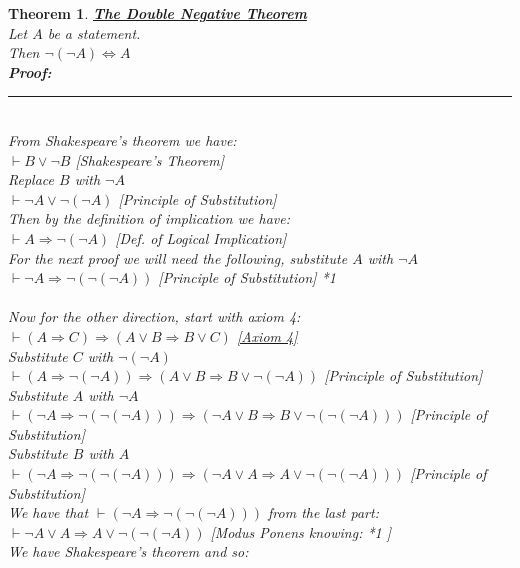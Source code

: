 \documentclass[12pt]{extarticle}
\theoremstyle{plain}
\newtheorem{thm}{Theorem}[section]
\theoremstyle{plain}
\theoremstyle{plain}
\theoremstyle{Definition}
\theoremstyle{Definition}
\theoremstyle{plain}
\theoremstyle{plain}
\newcommand{\prof}[0]{	\noindent \textbf{Proof:} \rule{500pt}{2pt} \\ }
\begin{document}
\begin{thm} \underline{\textbf{The Double Negative Theorem}} \\
	Let $A$ be a statement. \\ 
	Then $\lnot(\lnot A) \Leftrightarrow A$ \\
	\prof 
	From Shakespeare's theorem we have: \\ 
	$\vdash B \lor \lnot B$ \hfill [Shakespeare's Theorem] \\ 
	Replace $B$ with $\lnot A$ \\ 
	$\vdash \lnot A \lor \lnot (\lnot A)$ \hfill [Principle of Substitution]\\ 
	Then by the definition of implication we have: \\ 
	$\vdash A \Rightarrow \lnot (\lnot A)$ \hfill [Def. of Logical Implication] \\
	For the next proof we will need the following, substitute $A$ with $\lnot A$ \\ 
	$\vdash \lnot A \Rightarrow \lnot (\lnot (\lnot A))$ \hfill [Principle of Substitution] *1 \\ \\
	Now for the other direction, start with axiom 4: \\ 
	$\vdash (A \Rightarrow C) \Rightarrow ( A \lor B \Rightarrow B \lor C ) $ \hfill \hyperlink{Axioms}{[Axiom 4]}\\
	Substitute $C$ with $\lnot (\lnot A)$ \\
	$\vdash (A \Rightarrow \lnot (\lnot A)) \Rightarrow (A \lor B \Rightarrow B \lor \lnot (\lnot A) ) $ \hfill [Principle of Substitution]\\
	Substitute $A$ with $\lnot A$ \\ 
	$\vdash (\lnot A \Rightarrow \lnot (\lnot (\lnot A))) \Rightarrow (\lnot A \lor B \Rightarrow B \lor \lnot (\lnot (\lnot A)) ) $ \hfill [Principle of Substitution]\\
	Substitute $B$ with $A$ \\ 
	$\vdash (\lnot A \Rightarrow \lnot (\lnot (\lnot A))) \Rightarrow (\lnot A \lor A \Rightarrow A \lor \lnot (\lnot (\lnot A)) ) $ \hfill [Principle of Substitution]\\
	We have that $\vdash (\lnot A \Rightarrow \lnot (\lnot (\lnot A))) $ from the last part: \\
	$\vdash \lnot A \lor A \Rightarrow A \lor \lnot (\lnot (\lnot A))  $ \hfill [Modus Ponens knowing: *1 ]\\
	We have Shakespeare's theorem and so: \\ 

\end{thm}
\end{document}
